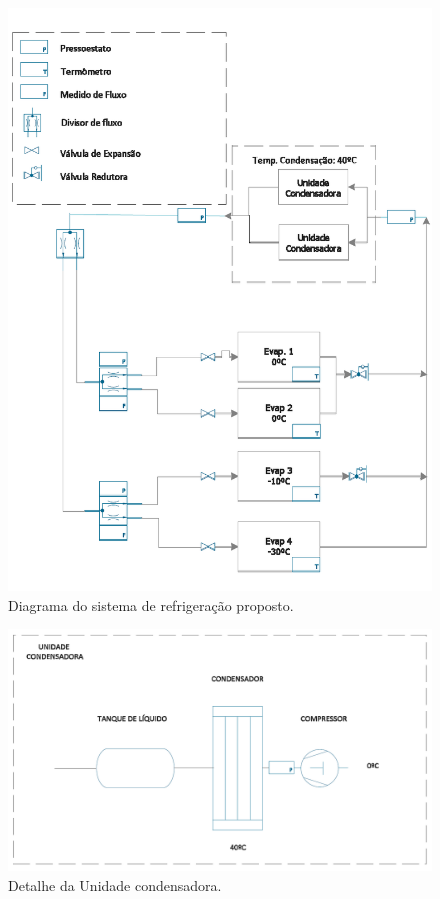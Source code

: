 \documentclass[10pt,a4paper]{article}
\begin{document}
\begin{figure}[H]
    \centering
    \includegraphics[scale = 0.6]{Figuras/layout_ciclo_1.PNG}
    \caption{Diagrama do sistema de refrigeração proposto.}
    \label{diagrama_layout}
\end{figure}

\begin{figure}[H]
    \centering
    \includegraphics[scale = 0.5]{Figuras/unidade_condensadora.PNG}
    \caption{Detalhe da Unidade condensadora.}
    \label{evaporador_produto_final}
\end{figure}
\end{document}
